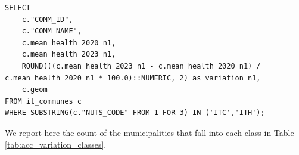 \begin{verbatim}
SELECT 
	c."COMM_ID",
	c."COMM_NAME",
	c.mean_health_2020_n1,
	c.mean_health_2023_n1,
	ROUND(((c.mean_health_2023_n1 - c.mean_health_2020_n1) / c.mean_health_2020_n1 * 100.0)::NUMERIC, 2) as variation_n1,
	c.geom
FROM it_communes c
WHERE SUBSTRING(c."NUTS_CODE" FROM 1 FOR 3) IN ('ITC','ITH');
\end{verbatim}


We report here the count of the municipalities that fall into each class in Table \ref{tab:acc_variation_classes}.




















